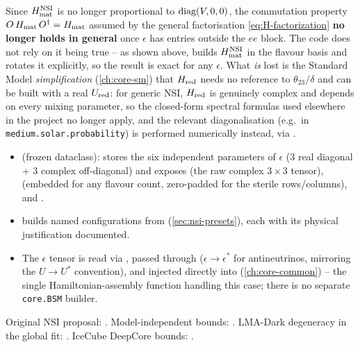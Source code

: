 \begin{notebox}
Since $H_{\rm mat}^{\rm NSI}$ is no longer proportional to $\operatorname{diag}(V,0,0)$,
the commutation property $O\,H_{\rm mat}\,O^\dagger=H_{\rm mat}$ assumed by
the general factorisation \cref{eq:H-factorization} \textbf{no longer holds
in general} once $\epsilon$ has entries outside the $ee$ block. The code
does not rely on it being true -- as shown above,
 builds $H_{\rm mat}^{\rm NSI}$ in the
flavour basis and rotates it explicitly, so the result is exact for any
$\epsilon$. What \emph{is} lost is the Standard Model \emph{simplification}
(\cref{ch:core-sm}) that $H_{\rm red}$ needs no reference to
$\theta_{23}/\delta$ and can be built with a real $U_{\rm red}$: for
generic NSI, $H_{\rm red}$ is genuinely complex and depends on every
mixing parameter, so the closed-form spectral formulas used elsewhere in
the project no longer apply, and the relevant diagonalisation (e.g.\ in
\texttt{medium.solar.probability}) is performed numerically instead, via
.
\end{notebox}

\begin{implbox}
\begin{itemize}
  \item {} (frozen dataclass): stores the six independent
    parameters of $\epsilon$ (3 real diagonal + 3 complex off-diagonal) and
    exposes  (the raw complex $3\times3$
    tensor),  (embedded for any
    flavour count, zero-padded for the sterile rows/columns), and
    .
  \item {} builds named configurations
    from 
    (\cref{sec:nsi-presets}), each with its physical justification
    documented.
  \item The $\epsilon$ tensor is read via
    , passed through
     ($\epsilon\to\epsilon^{*}$ for
    antineutrinos, mirroring the $U\to U^{*}$ convention), and injected
    directly into 
    (\cref{ch:core-common}) -- the single Hamiltonian-assembly function
    handling this case; there is no separate \texttt{core.BSM} builder.
\end{itemize}
\end{implbox}

\begin{refbox}
Original NSI proposal: \cite{Grossman1995}. Model-independent bounds:
\cite{BiggioBlennowFM2009}. LMA-Dark degeneracy in the global fit:
\cite{Esteban2018LMADark}. IceCube DeepCore bounds: \cite{IceCube2022NSI}.
\end{refbox}

